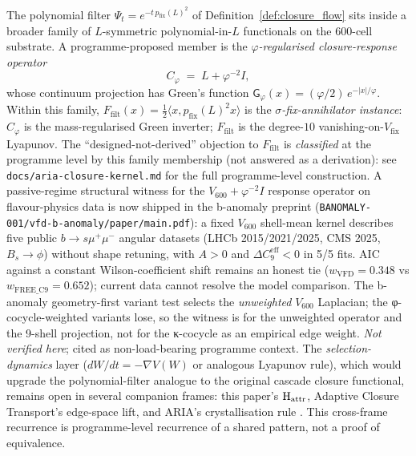 \documentclass[11pt, a4paper]{amsart}
\theoremstyle{definition}
\begin{document}
The polynomial filter $\Psi_t = e^{-t\,p_{\mathrm{fix}}(L)^2}$ of
Definition~\ref{def:closure_flow} sits inside a broader family of
$L$-symmetric polynomial-in-$L$ functionals on the 600-cell
substrate.  A programme-proposed member is the
\emph{$\varphi$-regularised closure-response operator}
\[
C_\varphi \;=\; L + \varphi^{-2} I,
\]
whose continuum projection has Green's function
$\mathsf G_\varphi(x) = (\varphi/2)\, e^{-|x|/\varphi}$.  Within this
family, $F_{\mathrm{filt}}(x)
= \tfrac{1}{2}\langle x, p_{\mathrm{fix}}(L)^2 x\rangle$ is the
\emph{$\sigma$-fix-annihilator instance}: $C_\varphi$ is the
mass-regularised Green inverter; $F_{\mathrm{filt}}$ is the
degree-$10$ vanishing-on-$V_{\mathrm{fix}}$ Lyapunov.  The
``designed-not-derived'' objection to $F_{\mathrm{filt}}$ is
\emph{classified} at the programme level by this family membership
(not answered as a derivation): see
\texttt{docs/aria-closure-kernel.md} for the full programme-level
construction.  A passive-regime structural witness for the
$V_{600} + \varphi^{-2} I$ response operator on flavour-physics
data is now shipped in the b-anomaly preprint
(\texttt{BANOMALY-001/vfd-b-anomaly/paper/main.pdf}): a fixed
$V_{600}$ shell-mean kernel describes five public
$b\to s\mu^+\mu^-$ angular datasets (LHCb 2015/2021/2025, CMS 2025,
$B_s\!\to\!\phi$) without shape retuning, with $A>0$ and
$\Delta C_9^{\mathrm{eff}}<0$ in 5/5 fits. AIC against a constant
Wilson-coefficient shift remains an honest tie
($w_{\mathrm{VFD}}=0.348$ vs $w_{\mathrm{FREE\_C9}}=0.652$);
current data cannot resolve the model comparison.
The b-anomaly geometry-first variant test selects the
\emph{unweighted} $V_{600}$ Laplacian; the φ-cocycle-weighted
variants lose, so the witness is for the unweighted operator and
the 9-shell projection, not for the κ-cocycle as an empirical
edge weight. \emph{Not verified here}; cited as non-load-bearing
programme context.
The \emph{selection-dynamics} layer ($dW/dt = -\nabla V(W)$ or
analogous Lyapunov rule), which would upgrade the polynomial-filter
analogue to the original cascade closure functional, remains open
in several companion frames: this paper's
$\textup{H}_{\mathrm{attr}}$, Adaptive Closure Transport's
edge-space lift, and ARIA's crystallisation rule
\cite{AdaptiveClosureTransport,ariaH4Olaw}.  This cross-frame
recurrence is programme-level recurrence of a shared pattern, not
a proof of equivalence.
\end{document}
